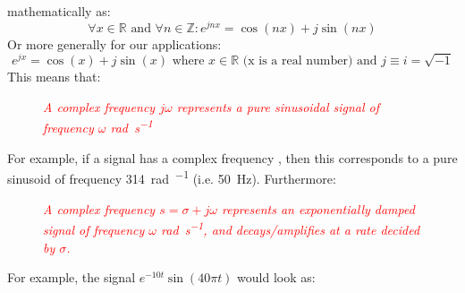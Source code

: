 \documentclass[12pt]{report}
\begin{document}
mathematically as:
\[\forall x \in \mathbb{R}\text{ and }\forall n \in \mathbb{Z}:
e^{jnx} = \cos(nx) + j\sin(nx)\] Or more generally for our
applications: \[e^{jx} = \cos(x) + j\sin(x)\text{ where }x \in \mathbb{R}\text{ (x is a real number) and  }j \equiv i = \sqrt{- 1}\]
This means that:
\begin{figure}[H]
    \centering
    \begin{mdframed}
        \begin{center}
            \textcolor{red}{\emph{A complex frequency \(j\omega \) represents a pure sinusoidal signal of
        frequency \(\omega \) \unit{\radian\per\second}}}
        \end{center}
    \end{mdframed}
\end{figure}
\newpage
\noindent For example, if a signal has a complex frequency  , then
this corresponds to a pure sinusoid of frequency \SI{314}{\radian\per\sec} (i.e. \SI{50}{\hertz}).
Furthermore:
\begin{figure}[H]
    \centering
    \begin{mdframed}
        \begin{center}
        \textcolor{red}{\emph{A complex frequency \(s = \sigma + j\omega \) represents an exponentially
        damped signal of frequency \(\omega \) \unit{\radian\per\second}, and decays/amplifies at a
        rate decided by \(\sigma \).}}
        \end{center}
    \end{mdframed}
\end{figure}
For example, the signal \( e^{- 10t}\sin(40\pi t) \) would look as:
\begin{figure}[H]
    \centering
\end{figure}
\end{document}
